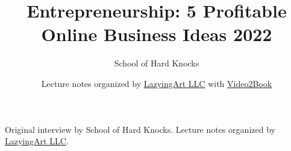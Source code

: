 \documentclass[11pt,oneside]{book}
\begin{document}
\frontmatter
\title{Entrepreneurship: 5 Profitable Online Business Ideas 2022}
\author{School of Hard Knocks}
\date{Lecture notes organized by \href{https://lazying.art}{LazyingArt LLC} with \href{https://github.com/lachlanchen/Video2Book}{Video2Book}}
\maketitle
\begin{center}
\small Original interview by School of Hard Knocks. Lecture notes organized by \href{https://lazying.art}{LazyingArt LLC}.
\end{center}
\clearpage
\mainmatter

\end{document}
